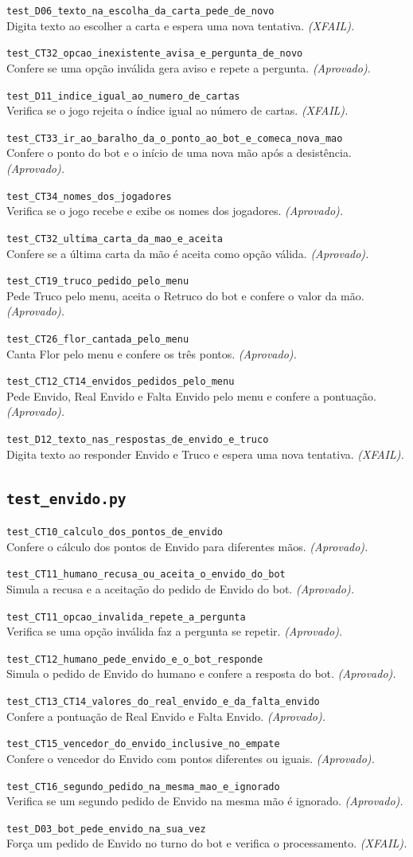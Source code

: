 \documentclass[11pt,a4paper]{article}
\newcommand{\teste}[3]{\par\noindent\begin{minipage}{\textwidth}\texttt{#1}\\#2 \emph{(#3).}\end{minipage}\par\vspace{0.15em}}
\begin{document}
\teste{test\_D06\_texto\_na\_escolha\_da\_carta\_pede\_de\_novo}{Digita texto ao escolher a carta e espera uma nova tentativa.}{XFAIL}
\teste{test\_CT32\_opcao\_inexistente\_avisa\_e\_pergunta\_de\_novo}{Confere se uma opção inválida gera aviso e repete a pergunta.}{Aprovado}
\teste{test\_D11\_indice\_igual\_ao\_numero\_de\_cartas}{Verifica se o jogo rejeita o índice igual ao número de cartas.}{XFAIL}
\teste{test\_CT33\_ir\_ao\_baralho\_da\_o\_ponto\_ao\_bot\_e\_comeca\_nova\_mao}{Confere o ponto do bot e o início de uma nova mão após a desistência.}{Aprovado}
\teste{test\_CT34\_nomes\_dos\_jogadores}{Verifica se o jogo recebe e exibe os nomes dos jogadores.}{Aprovado}
\teste{test\_CT32\_ultima\_carta\_da\_mao\_e\_aceita}{Confere se a última carta da mão é aceita como opção válida.}{Aprovado}
\teste{test\_CT19\_truco\_pedido\_pelo\_menu}{Pede Truco pelo menu, aceita o Retruco do bot e confere o valor da mão.}{Aprovado}
\teste{test\_CT26\_flor\_cantada\_pelo\_menu}{Canta Flor pelo menu e confere os três pontos.}{Aprovado}
\teste{test\_CT12\_CT14\_envidos\_pedidos\_pelo\_menu}{Pede Envido, Real Envido e Falta Envido pelo menu e confere a pontuação.}{Aprovado}
\teste{test\_D12\_texto\_nas\_respostas\_de\_envido\_e\_truco}{Digita texto ao responder Envido e Truco e espera uma nova tentativa.}{XFAIL}
\subsection*{\texttt{\textbf{test\_envido.py}}}
\teste{test\_CT10\_calculo\_dos\_pontos\_de\_envido}{Confere o cálculo dos pontos de Envido para diferentes mãos.}{Aprovado}
\teste{test\_CT11\_humano\_recusa\_ou\_aceita\_o\_envido\_do\_bot}{Simula a recusa e a aceitação do pedido de Envido do bot.}{Aprovado}
\teste{test\_CT11\_opcao\_invalida\_repete\_a\_pergunta}{Verifica se uma opção inválida faz a pergunta se repetir.}{Aprovado}
\teste{test\_CT12\_humano\_pede\_envido\_e\_o\_bot\_responde}{Simula o pedido de Envido do humano e confere a resposta do bot.}{Aprovado}
\teste{test\_CT13\_CT14\_valores\_do\_real\_envido\_e\_da\_falta\_envido}{Confere a pontuação de Real Envido e Falta Envido.}{Aprovado}
\teste{test\_CT15\_vencedor\_do\_envido\_inclusive\_no\_empate}{Confere o vencedor do Envido com pontos diferentes ou iguais.}{Aprovado}
\teste{test\_CT16\_segundo\_pedido\_na\_mesma\_mao\_e\_ignorado}{Verifica se um segundo pedido de Envido na mesma mão é ignorado.}{Aprovado}
\teste{test\_D03\_bot\_pede\_envido\_na\_sua\_vez}{Força um pedido de Envido no turno do bot e verifica o processamento.}{XFAIL}
\end{document}
